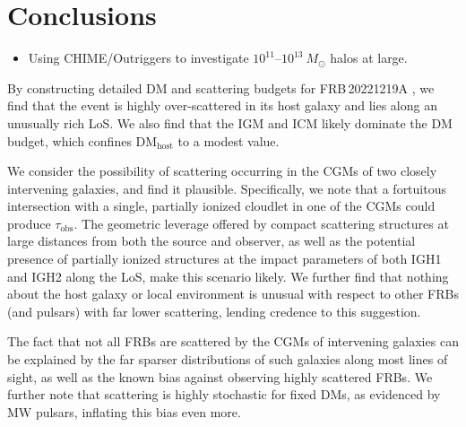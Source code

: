 \documentclass[twocolumn, linenumbers, tra]{aastex631}
\newcommand{\rev}[1]{{\color{purple}#1}}
\newcommand{\nihari}{FRB\,20221219A } %
\begin{document}
\section{Conclusions} \label{sec:conclusions}

\begin{itemize}
  \item Using CHIME/Outriggers to investigate $10^{11}$--$10^{13}\ M_\odot$ halos at large.
\end{itemize}

By constructing detailed DM and scattering budgets for \nihari, we find that the event is highly over-scattered in its host galaxy and lies along an unusually rich LoS. We also find that the IGM and ICM likely dominate the DM budget, which confines DM$_{\mathrm{host}}$ to a modest value.

We consider the possibility of scattering occurring in the CGMs of two closely intervening galaxies, and find it plausible. Specifically, we note that a fortuitous intersection with a single, partially ionized cloudlet in one of the CGMs could produce $\tau_{\mathrm{obs}}$. The geometric leverage offered by compact scattering structures at large distances from both the source and observer, as well as the potential presence of partially ionized structures at the impact parameters of both IGH1 and IGH2 along the LoS, make this scenario likely. We further find that nothing about the host galaxy or local environment is unusual with respect to other FRBs (and pulsars) with far lower scattering, lending credence to this suggestion.

The fact that \rev{not all FRBs} are scattered by the CGMs of intervening galaxies can be explained by the far sparser distributions of such galaxies along most lines of sight, as well as the known bias against observing highly scattered FRBs. We further note that scattering is highly stochastic for fixed DMs, as evidenced by MW pulsars, inflating this bias even more.

\end{document}
